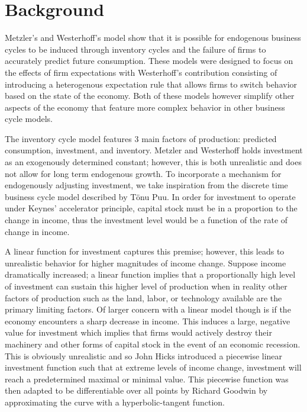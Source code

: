\section{Background}
Metzler's and Westerhoff's model show that it is possible for endogenous business cycles to be induced through inventory cycles and the failure of firms to accurately predict future consumption. These models were designed to focus on the effects of firm expectations with Westerhoff's contribution consisting of introducing a heterogenous expectation rule that allows firms to switch behavior based on the state of the economy. Both of these models however simplify other aspects of the economy that feature more complex behavior in other business cycle models.

The inventory cycle model features 3 main factors of production: predicted consumption, investment, and inventory. Metzler and Westerhoff holds investment as an exogenously determined constant; however, this is both unrealistic and does not allow for long term endogenous growth. To incorporate a mechanism for endogenously adjusting investment, we take inspiration from the discrete time business cycle model described by T\"{o}nu Puu\autocite{Puu2003}. In order for investment to operate under Keynes' accelerator principle, capital stock must be in a proportion to the change in income, thus the investment level would be a function of the rate of change in income. 

A linear function for investment captures this premise; however, this leads to unrealistic behavior for higher magnitudes of income change. Suppose income dramatically increased; a linear function implies that a proportionally high level of investment can sustain this higher level of production when in reality other factors of production such as the land, labor, or technology available are the primary limiting factors. Of larger concern with a linear model though is if the economy encounters a sharp decrease in income. This induces a large, negative value for investment which implies that firms would actively destroy their machinery and other forms of capital stock in the event of an economic recession. This is obviously unrealistic and so John Hicks introduced a piecewise linear investment function such that at extreme levels of income change, investment will reach a predetermined maximal or minimal value. This piecewise function was then adapted to be differentiable over all points by Richard Goodwin by approximating the curve with a hyperbolic-tangent function\autocite{Puu2003}.

